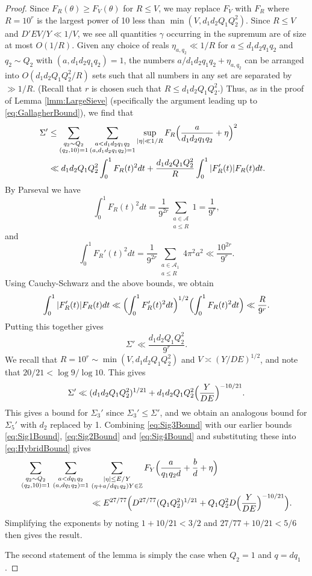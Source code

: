 \documentclass[10pt]{amsart}
\theoremstyle{plain}
\numberwithin{sblmm}{thrm}
\numberwithin{equation}{section}
\begin{document}
\begin{proof}
Since $F_R(\theta)\ge F_V(\theta)$ for $R\le V$, we may replace $F_V$ with $F_R$ where $R=10^r$ is the largest power of 10 less than $\min(V,d_1d_2Q_1Q_2^2)$. Since $R\le V$ and $D' E V/Y\ll1/V$, we see all quantities $\gamma$ occurring in the supremum are of size at most $O(1/R)$. Given any choice of reals $\eta_{a,q_2}\ll 1/R$ for $a\le d_1d_2q_1q_2$ and $q_2\sim Q_2$ with $(a,d_1d_2q_1q_2)=1$, the numbers $a/d_1d_2q_1q_2+\eta_{a,q_2}$ can be arranged into $O(d_1d_2Q_1Q_2^2/R)$ sets such that all numbers in any set are separated by $\gg 1/R$. (Recall that $r$ is chosen such that $R\le  d_1d_2Q_1Q_2^2$.) Thus, as in the proof of Lemma \ref{lmm:LargeSieve} (specifically the argument leading up to \eqref{eq:GallagherBound}), we find that
%
\begin{align*}
\Sigma'&\le \sum_{\substack{q_2\sim Q_2\\ (q_2,10)=1}}\sum_{\substack{a< d_1d_2q_1q_2\\ (a,d_1d_2q_1q_2)=1}}\sup_{|\eta|\ll 1/R}F_{R}\Bigl(\frac{a}{d_1d_2q_1q_2}+\eta\Bigr)^2&\\
&\ll d_1d_2Q_1Q_2^2\int_0^1 F_{R}(t)^2 d t+\frac{d_1d_2Q_1Q_2^2}{R}\int_0^1|F_{R}'(t)|F_{R}(t) d t.
\end{align*}
%
By Parseval we have
\[
\int_0^1 F_{R}(t)^2d t=\frac{1}{9^{2r}}\sum_{\substack{a\in\mathcal{A}\\ a\le R}}1=\frac{1}{9^{r}},
\]
and
\[
 \int_0^1F_{R}'(t)^2d t=\frac{1}{9^{2r}}\sum_{\substack{a\in\mathcal{A}_1\\ a\le R}}4\pi^2 a^2\ll \frac{10^{2r}}{9^{r}}.
\]
Using Cauchy-Schwarz and the above bounds, we obtain
\[
\int_0^1|F_R'(t)|F_R(t)d t\ll \Bigl(\int_0^1F_R'(t)^2d t\Bigr)^{1/2}\Bigl(\int_0^1F_R(t)^2d t\Bigr)\ll \frac{R}{9^r}.
\]
Putting this together gives
\[
\Sigma'\ll \frac{d_1d_2Q_1Q_2^2}{9^r}.
\]
We recall that $R=10^{r}\sim \min(V,d_1d_2Q_1Q_2^2)$ and $V\asymp (Y/DE)^{1/2}$, and note that $20/21<\log{9}/\log{10}$. This gives 
%
\begin{equation}
\Sigma'\ll (d_1d_2Q_1Q_2^2)^{1/21}+d_1d_2Q_1Q_2^2\Bigl(\frac{Y}{D E}\Bigr)^{-10/21}.\label{eq:Sig3Bound}
\end{equation}
%
This gives a bound for $\Sigma_3'$ since $\Sigma_3'\le \Sigma'$, and we obtain an analogous bound for $\Sigma_5'$ with $d_2$ replaced by 1. Combining \eqref{eq:Sig3Bound} with our earlier bounds \eqref{eq:Sig1Bound}, \eqref{eq:Sig2Bound} and \eqref{eq:Sig4Bound} and substituting these into \eqref{eq:HybridBound} gives
\begin{align*}
\sum_{\substack{q_2\sim Q_2\\ (q_2,10)=1}}\,\sum_{\substack{a< d q_1q_2\\ (a,d q_1q_2)=1}}\,&\sum_{\substack{|\eta|\le E/Y\\ (\eta+a/d q_1q_2)Y\in\mathbb{Z}}}F_Y\Bigl(\frac{a}{q_1q_2d}+\frac{b}{d}+\eta\Bigr)\\
&\ll E^{27/77}\Bigl(D^{27/77}(Q_1Q_2^2)^{1/21}+Q_1Q_2^2D\Bigl(\frac{Y}{D E}\Bigr)^{-10/21}\Bigr).
\end{align*}
Simplifying the exponents by noting $1+10/21<3/2$ and $27/77+10/21<5/6$ then gives the result.

The second statement of the lemma is simply the case when $Q_2=1$ and $q=d q_1$.
%
\end{proof}
\end{document}
